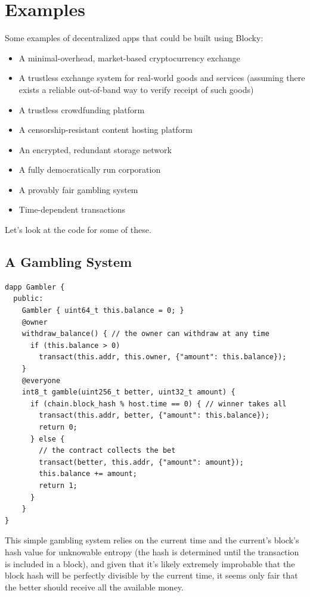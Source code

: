 \documentclass[letterpaper]{article}
\begin{document}
\section{Examples}

Some examples of decentralized apps that could be built using Blocky:
\begin{itemize}
  \item{A minimal-overhead, market-based cryptocurrency exchange}
  \item{A trustless exchange system for real-world goods and services (assuming there exists a reliable out-of-band way to verify receipt of such goods)}
  \item{A trustless crowdfunding platform}
  \item{A censorship-resistant content hosting platform}
  \item{An encrypted, redundant storage network}
  \item{A fully democratically run corporation}
  \item{A provably fair gambling system}
  \item{Time-dependent transactions}
\end{itemize}

Let's look at the code for some of these.
\subsection{A Gambling System}
\begin{lstlisting}
dapp Gambler {
  public:
    Gambler { uint64_t this.balance = 0; }
    @owner
    withdraw_balance() { // the owner can withdraw at any time
      if (this.balance > 0)
        transact(this.addr, this.owner, {"amount": this.balance});
    }
    @everyone
    int8_t gamble(uint256_t better, uint32_t amount) {
      if (chain.block_hash % host.time == 0) { // winner takes all
        transact(this.addr, better, {"amount": this.balance});
        return 0;
      } else {
        // the contract collects the bet
        transact(better, this.addr, {"amount": amount});
        this.balance += amount;
        return 1;
      }
    }
}
\end{lstlisting}
This simple gambling system relies on the current time and the current's block's hash value for unknowable entropy (the hash is determined until the transaction is included in a block), and given that it's likely extremely improbable that the block hash will be perfectly divisible by the current time, it seems only fair that the better should receive all the available money.
\newline
\end{document}
